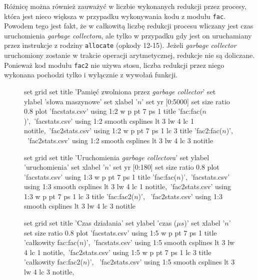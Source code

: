 Różnicę można również zauważyć w liczbie wykonanych redukcji przez procesy, która jest nieco większa w przypadku wykonywania kodu z modułu \texttt{fac}.
Powodem tego jest fakt, że w całkowitą liczbę redukcji procesu wliczany jest czas uruchomienia \emph{garbage collectora}, ale tylko w przypadku gdy jest on uruchamiany przez instrukcje z rodziny \texttt{allocate} (opkody 12-15). Jeżeli \emph{garbage collector} uruchomiony zostanie w trakcie operacji arytmetycznej, redukcje nie są doliczane.
Ponieważ kod modułu \texttt{fac2} nie używa stosu, liczba redukcji przez niego wykonana pochodzi tylko i wyłącznie z wywołań funkcji.

\begin{figure}

\begin{multicols}{2}

\begin{gnuplot}[terminal=epslatex,terminaloptions=color,scale=0.7]
	set grid
	set title 'Pamięć zwolniona przez \emph{garbage collector}'
	set ylabel 'słowa maszynowe'
	set xlabel '$n$'
	set yr [0:5000]
	set size ratio 0.8
	plot 'facstats.csv' using 1:2 w p pt 7 ps 1 title 'fac:fac($n$)',\
			'facstats.csv' using 1:2 smooth csplines lt 3 lw 4 lc 1 notitle,\
			'fac2stats.csv' using 1:2 w p pt 7 ps 1 lc 3 title 'fac2:fac($n$)', \
			'fac2stats.csv' using 1:2 smooth csplines lt 3 lw 4 lc 3 notitle
\end{gnuplot}

\begin{gnuplot}[terminal=epslatex,terminaloptions=color,scale=0.7]
	set grid
	set title 'Uruchomienia \emph{garbage collectora}'
	set ylabel 'uruchomienia'
	set xlabel '$n$'
	set yr [0:180]
	set size ratio 0.8
	plot 'facstats.csv' using 1:3 w p pt 7 ps 1 title 'fac:fac($n$)',\
			'facstats.csv' using 1:3 smooth csplines lt 3 lw 4 lc 1 notitle,\
			'fac2stats.csv' using 1:3 w p pt 7 ps 1 lc 3 title 'fac:fac2($n$)', \
			'fac2stats.csv' using 1:3 smooth csplines lt 3 lw 4 lc 3 notitle
\end{gnuplot}

\begin{gnuplot}[terminal=epslatex,terminaloptions=color,scale=0.7]
	set grid
	set title 'Czas działania'
	set ylabel 'czas ($\mu s$)'
	set xlabel '$n$'
	set size ratio 0.8
	plot 'facstats.csv' using 1:5 w p pt 7 ps 1 title 'całkowity fac:fac($n$)',\
			'facstats.csv' using 1:5 smooth csplines lt 3 lw 4 lc 1 notitle,\
			'fac2stats.csv' using 1:5 w p pt 7 ps 1 lc 3 title 'całkowity fac:fac2($n$)', \
			'fac2stats.csv' using 1:5 smooth csplines lt 3 lw 4 lc 3 notitle,\
\end{gnuplot}



\end{multicols}
\end{figure}
